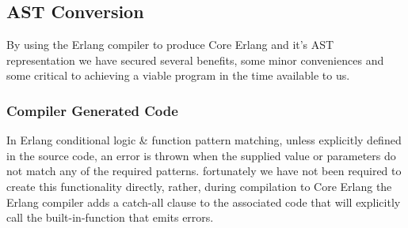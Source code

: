 \documentclass[twoside,12pt,titlepage,a4paper]{article}
\begin{document}
\subsection{AST Conversion}
	By using the Erlang compiler to produce Core Erlang and it's AST representation we have secured several benefits, some minor conveniences and some critical to achieving a viable program in the time available to us.
\subsubsection{Compiler Generated Code}
	In Erlang conditional logic \& function pattern matching, unless explicitly defined in the source code, an error is thrown when the supplied value or parameters do not match any of the required patterns. fortunately we have not been required to create this functionality directly, rather, during compilation to Core Erlang the Erlang compiler adds a catch-all clause to the associated code that will explicitly call the built-in-function that emits errors.
	
\end{document}
